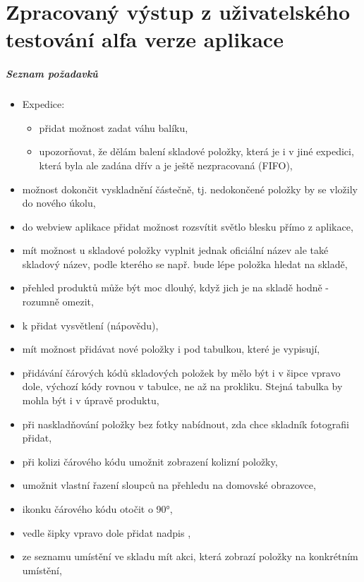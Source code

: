 \chapter{Zpracovaný výstup z uživatelského testování alfa verze aplikace} \label{ap:testing_requirements}

\paragraph{Seznam požadavků}

\begin{itemize}
	\item Expedice:
	\begin{itemize}
		\item přidat možnost zadat váhu balíku,
		\item upozorňovat, že dělám balení skladové položky, která je i v jiné expedici, která byla ale zadána dřív a je ještě nezpracovaná (FIFO),
	\end{itemize}
	\item možnost dokončit vyskladnění částečně, tj. nedokončené položky by se vložily do nového úkolu,
	\item do webview aplikace přidat možnost rozsvítit světlo blesku přímo z aplikace,
	\item mít možnost u skladové položky vyplnit jednak oficiální název ale také skladový název, podle kterého se např. bude lépe položka hledat na skladě,
	\item přehled produktů může být moc dlouhý, když jich je na skladě hodně - rozumně omezit,
	\item k  přidat vysvětlení (nápovědu),
	\item mít možnost přidávat nové položky i pod tabulkou, které je vypisují,
	\item přidávání čárových kódů skladových položek by mělo být i v šipce vpravo dole, výchozí kódy rovnou v tabulce, ne až na prokliku. Stejná tabulka by mohla být i v úpravě produktu,
	\item při naskladňování položky bez fotky nabídnout, zda chce skladník fotografii přidat,
	\item při kolizi čárového kódu umožnit zobrazení kolizní položky,
	\item umožnit vlastní řazení sloupců na přehledu na domovské obrazovce,
	\item ikonku čárového kódu otočit o 90°,
	\item vedle šipky vpravo dole přidat nadpis ,
	\item ze seznamu umístění ve skladu mít akci, která zobrazí položky na konkrétním umístění,

\end{itemize}
